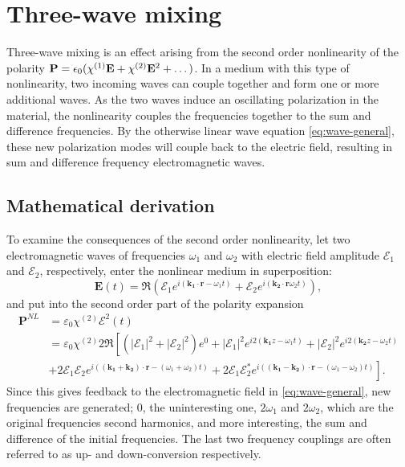 \chapter{Three-wave mixing}
\label{cha:mixing}


Three-wave mixing is an effect arising from the second order
nonlinearity of the polarity $\mathbf P = \epsilon_0 ( \chi^{\textup{(1)}} \mathbf E +
\chi^{\textup{(2)}} \mathbf E^2 + \dots )$.
In a medium with this type of nonlinearity,
two incoming waves can couple together and form one or more additional waves.
As the two waves induce an oscillating polarization in the material,
the nonlinearity couples the frequencies together
to the sum and difference frequencies.
By the otherwise linear wave equation \eqref{eq:wave-general},
these new polarization modes will couple back to the electric field,
resulting in sum and difference frequency electromagnetic waves.

\section{Mathematical derivation}
\label{sec:mixing-math}

To examine the consequences of the second order nonlinearity,
let two electromagnetic waves of frequencies $\omega_1$ and $\omega_2$ with electric field amplitude $\mathcal{E}_1$ and $\mathcal{E}_2$, respectively,
enter the nonlinear medium in superposition: 
\[
\mathbf{\mathbf{E}}(t) = \Re (\mathcal{E}_1e^{i(\mathbf{k_1} \cdot \mathbf{r} - \omega_1 t)}+\mathcal{E}_2e^{i(\mathbf{k_2} \cdot \mathbf{r} \omega_2 t)}),
\]
and put into the second order part of the polarity expansion \cite[sec.~21.2C]{saleh}
\begin{align}
     \mathbf{P}^{NL} & = \varepsilon_0 \chi^{(2)} \mathbf{\mathcal{E}}^2(t) \nonumber \\
&= \varepsilon_0 \chi^{(2)} 2 \Re \left[
\left(|\mathcal{E}_1|^2+|\mathcal{E}_2|^2\right)e^{0} + |\mathcal{E}_1|^2e^{i2(\mathbf{k_1} z - \omega_1t)}+|\mathcal{E}_2|^2e^{i2(\mathbf{k_2} z - \omega_2t)} \right.\nonumber \\
& \left.
+ 2\mathcal{E}_1 \mathcal{E}_2e^{i((\mathbf{k_1} + \mathbf{k_2}) \cdot \mathbf{r} - (\omega_1+\omega_2)t)} 
+ 2\mathcal{E}_1 \mathcal{E}_2^*e^{i((\mathbf{k_1} - \mathbf{k_2}) \cdot \mathbf{r} - (\omega_1-\omega_2)t)} 
\right] \label{eq:MixPNL}.
\end{align}
Since this gives feedback to the electromagnetic field in \cref{eq:wave-general}, new frequencies are generated; $0$, the uninteresting one, $2\omega_1$ and $2\omega_2$, which are the original frequencies second harmonics, and more interesting, the sum and difference of the initial frequencies. The last two frequency couplings are often referred to as up- and down-conversion respectively.

